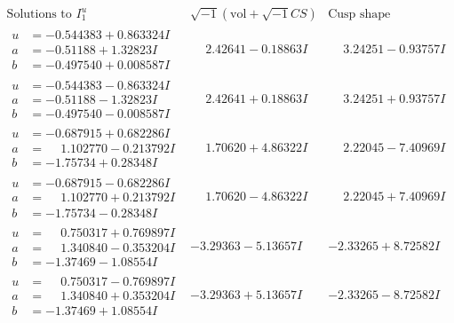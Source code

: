 \documentclass[1p]{elsarticle_modified}
\theoremstyle{definition}
\newcommand{\I}{\sqrt{-1}}
\begin{document}
$$\begin{array}{c|c|c}  
\text{Solutions to }I^u_{1}& \I (\text{vol} + \sqrt{-1}CS) & \text{Cusp shape}\\
 \hline 
\begin{aligned}
u &= -0.544383 + 0.863324 I \\
a &= -0.51188 + 1.32823 I \\
b &= -0.497540 + 0.008587 I\end{aligned}
 & \phantom{-}2.42641 - 0.18863 I & \phantom{-}3.24251 - 0.93757 I \\ \hline\begin{aligned}
u &= -0.544383 - 0.863324 I \\
a &= -0.51188 - 1.32823 I \\
b &= -0.497540 - 0.008587 I\end{aligned}
 & \phantom{-}2.42641 + 0.18863 I & \phantom{-}3.24251 + 0.93757 I \\ \hline\begin{aligned}
u &= -0.687915 + 0.682286 I \\
a &= \phantom{-}1.102770 - 0.213792 I \\
b &= -1.75734 + 0.28348 I\end{aligned}
 & \phantom{-}1.70620 + 4.86322 I & \phantom{-}2.22045 - 7.40969 I \\ \hline\begin{aligned}
u &= -0.687915 - 0.682286 I \\
a &= \phantom{-}1.102770 + 0.213792 I \\
b &= -1.75734 - 0.28348 I\end{aligned}
 & \phantom{-}1.70620 - 4.86322 I & \phantom{-}2.22045 + 7.40969 I \\ \hline\begin{aligned}
u &= \phantom{-}0.750317 + 0.769897 I \\
a &= \phantom{-}1.340840 - 0.353204 I \\
b &= -1.37469 - 1.08554 I\end{aligned}
 & -3.29363 - 5.13657 I & -2.33265 + 8.72582 I \\ \hline\begin{aligned}
u &= \phantom{-}0.750317 - 0.769897 I \\
a &= \phantom{-}1.340840 + 0.353204 I \\
b &= -1.37469 + 1.08554 I\end{aligned}
 & -3.29363 + 5.13657 I & -2.33265 - 8.72582 I \\ \hline\begin{aligned}

\end{aligned}
\end{array}$$
\end{document}
